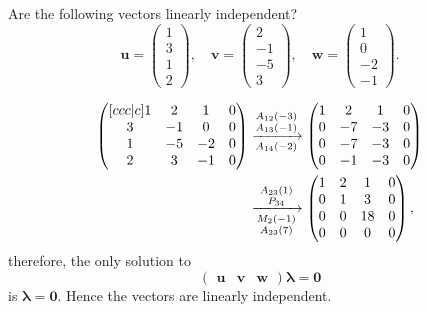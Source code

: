 \begin{example}
    Are the following vectors linearly independent?
    \[
        \bm{u} =
        \begin{pmatrix}
            1\\3\\1\\2
        \end{pmatrix}
        , \quad \bm{v} =
        \begin{pmatrix}
            2\\-1\\-5\\3
        \end{pmatrix}
        , \quad \bm{w} =
        \begin{pmatrix}
            1\\0\\-2\\-1
        \end{pmatrix}
        .
    \]
    
    \begin{align*}
        \begin{pmatrix}[ccc|c]
            1 & 2 & 1 & 0 \\
            3 & -1 & 0 & 0 \\
            1 & -5 & -2 & 0 \\
            2 & 3 & -1 & 0 \\
        \end{pmatrix}
        & \eroarrowext{A_{12}(-3)}{A_{13}(-1)}{A_{14}(-2)}{}
        \begin{pmatrix}
            1 & 2 & 1 & 0 \\
            0 & -7 & -3 & 0 \\
            0 & -7 & -3 & 0 \\
            0 & -1 & -3 & 0 \\
        \end{pmatrix}
        \\
        & \eroarrowext{A_{23}(1)}{P_{34}}{M_2(-1)}{A_{23}(7)}
        \begin{pmatrix}
            1 & 2 & 1 & 0 \\
            0 & 1 & 3 & 0 \\
            0 & 0 & 18 & 0 \\
            0 & 0 & 0 & 0 \\
        \end{pmatrix}
        ,
    \end{align*}
    therefore, the only solution to 
    \[
        \begin{pmatrix}
            \bm{u} & \bm{v} & \bm{w}
        \end{pmatrix}
        \bm{\lambda} = \bm{0}
    \] is $\bm{\lambda} = \bm{0}$. Hence the vectors are linearly independent.
\end{example}

